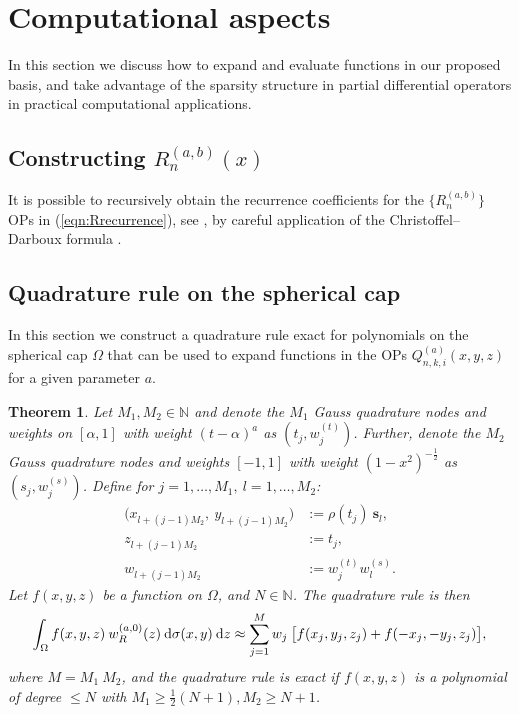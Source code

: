 \documentclass[11pt, oneside]{article}   	%
\newcommand{\half}{\frac{1}{2}}
\newcommand{\N}{\mathbb{N}}
\newcommand{\genjac}{R}
\newcommand{\genjacw}{w_\genjac}
\newcommand{\scop}{Q}
\newcommand{\scopnki}{\scop_{n,k,i}}
\newcommand{\scopnkia}{\scopnki^{(a)}}
\newtheorem{theorem}{Theorem}
\begin{document}
%
\section{Computational aspects}\label{Section:Computation}

In this section we discuss how to expand and evaluate functions in our proposed basis, and take advantage of the sparsity structure in partial differential operators in practical computational applications.


\subsection{Constructing $\genjac_n^{(a,b)}(x)$}

It is possible to recursively obtain the recurrence coefficients for the $\{\genjac_n^{(a,b)}\}$ OPs in (\ref{eqn:Rrecurrence}), see \cite{snowball2019sparse}, by careful application of the Christoffel--Darboux formula \cite[18.2.12]{DLMF}.


\subsection{Quadrature rule on the spherical cap}\label{subsection:quadrule}

In this section we construct a quadrature rule exact for polynomials on the spherical cap $\Omega$ that can be used to expand functions in the OPs $\scopnkia(x,y,z)$ for a given parameter $a$.

\begin{theorem}\label{Theorem:quadrule}
Let $M_1, M_2 \in \N$ and denote the $M_1$ Gauss quadrature nodes and weights on $[\alpha,1]$ with weight $(t - \alpha)^a$ as $(t_j, w_j^{(t)})$. Further, denote the $M_2$ Gauss quadrature nodes and weights $[-1,1]$ with weight $(1 - x^2)^{-\half}$ as $(s_j, w_j^{(s)})$.
Define for $j = 1,\dots,M_1, \: l=1,\dots,M_2$:
\begin{align*}
	\big(x_{l+(j-1)M_2}, \: y_{l+(j-1)M_2} \big) &:= \rho(t_j) \: \mathbf{s}_l, \\
	z_{l+(j-1)M_2} &:= t_j, \\
	w_{l+(j-1)M_2} &:= w_j^{(t)} w_l^{(s)}.
\end{align*}
Let $f(x,y,z)$ be a function on $\Omega$, and $N \in \N$. The quadrature rule is then
\begin{align*}
	\int_\Omega f(x,y,z) \: \genjacw^{(a,0)}(z) \: \D \sigma(x,y) \: \D z \approx \sum_{j=1}^{M} w_j \: \big[ f(x_j, y_j, z_j) + f(-x_j, -y_j, z_j) \big],
\end{align*}
where $M = M_1 \: M_2$, and the quadrature rule is exact if $f(x,y,z)$ is a polynomial of degree $\le N$ with $M_1 \ge \half (N+1), M_2 \ge N+1$.
\end{theorem}
\end{document}
